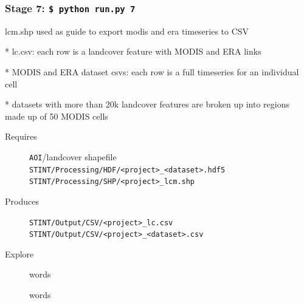 \documentclass[twoside,a4paper]{refart}
\begin{document}
\subsubsection{\textbf{Stage 7:} \texttt{\$ python run.py 7}}
      lcm.shp used as guide to export modis and era timeseries to CSV
      
        * lc.csv: each row is a landcover feature with MODIS and ERA links
        
        * MODIS and ERA dataset csvs: each row is a full timeseries for an
          individual cell
          
        * datasets with more than 20k landcover features are broken up into
          regions made up of 50 MODIS cells

  \begin{description}
    \item [Requires]
      \texttt{AOI}/landcover shapefile \\
      \texttt{STINT/Processing/HDF/<project>\_<dataset>.hdf5} \\
      \texttt{STINT/Processing/SHP/<project>\_lcm.shp}
  
  
    \item [Produces]
      \texttt{STINT/Output/CSV/<project>\_lc.csv} \\
      \texttt{STINT/Output/CSV/<project>\_<dataset>.csv} \\
      

    \item [Explore]
      words
      
      words
  \end{description}
\end{document}
